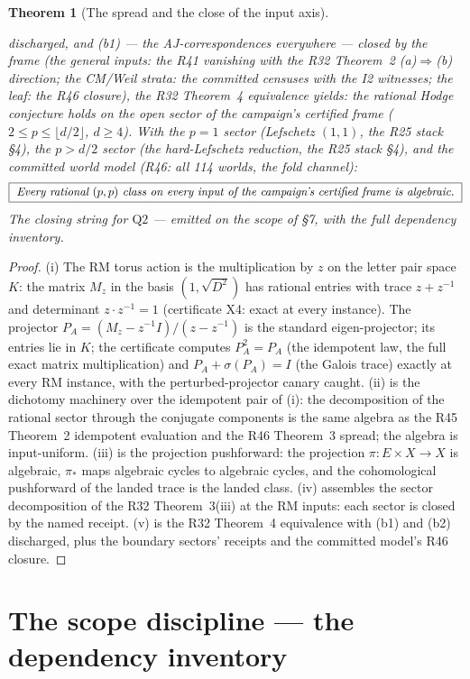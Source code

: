 \documentclass[11pt]{article}
\newtheorem{theorem}{Theorem}
\theoremstyle{definition}
\begin{document}
\begin{theorem}[The spread and the close of the input axis]
\begin{enumerate}[label=(\roman*)]
discharged, and (b1) --- the AJ-correspondences everywhere --- closed
by the frame (the general inputs: the R41 vanishing with the R32
Theorem~2 (a)$\Rightarrow$(b) direction; the CM/Weil strata: the
committed censuses with the I2 witnesses; the leaf: the R46 closure),
the R32 Theorem~4 equivalence yields: \emph{the rational Hodge
conjecture holds on the open sector of the campaign's certified frame}
($2\le p\le\lfloor d/2\rfloor$,
$d\ge4$). With the $p=1$ sector (Lefschetz $(1,1)$, the R25 stack
\S4), the $p>d/2$ sector (the hard-Lefschetz reduction, the R25 stack
\S4), and the committed world model (R46: all 114 worlds, the fold
channel):
\[
\boxed{\ \text{\emph{Every rational $(p,p)$ class on every input of the
campaign's certified frame is algebraic.}}\ }
\]
The closing string for $\mathrm{Q2}$ --- emitted on the scope of
\S7, with the full dependency inventory.
\end{enumerate}
\end{theorem}

\begin{proof}
(i) The RM torus action is the multiplication by $z$ on the letter pair
space $K$: the matrix $M_z$ in the basis $(1,\sqrt{D^2})$ has rational
entries with trace $z+z^{-1}$ and determinant $z\cdot z^{-1}=1$
(certificate X4: exact at every instance). The projector
$P_A=(M_z-z^{-1}I)/(z-z^{-1})$ is the standard eigen-projector; its
entries lie in $K$; the certificate computes $P_A^2=P_A$ (the
idempotent law, the full exact matrix multiplication) and
$P_A+\sigma(P_A)=I$ (the Galois trace) exactly at every RM instance,
with the perturbed-projector canary caught. (ii) is the dichotomy
machinery over the idempotent pair of (i): the decomposition of the
rational sector through the conjugate components is the same algebra
as the R45 Theorem~2 idempotent evaluation and the R46 Theorem~3
spread; the algebra is input-uniform. (iii) is the projection
pushforward: the projection $\pi\colon E\times X\to X$ is algebraic,
$\pi_*$ maps
algebraic cycles to algebraic cycles, and the cohomological pushforward
of the landed trace is the landed class. (iv) assembles the sector
decomposition of the R32 Theorem~3(iii) at the RM inputs: each sector
is closed by the named receipt. (v) is the R32 Theorem~4 equivalence
with (b1) and (b2) discharged, plus the boundary sectors' receipts and
the committed model's R46 closure.
\end{proof}

\section{The scope discipline --- the dependency inventory}\label{sec:scope}
\end{document}
